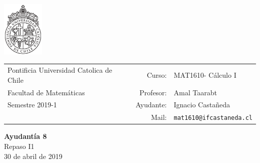 \documentclass[12pt]{article}
\makeatletter
\newcommand{\ayudantia}{{\sc Ayudantía 8}}
\newcommand{\tituloayu}{Repaso I1}
\newcommand{\fecha}{30 de abril de 2019}
\newcommand{\sigla}{MAT1610}
\newcommand{\nombre}{Cálculo I}
\newcommand{\profesor}{Amal Taarabt}
\newcommand{\ano}{2019}
\newcommand{\semestre}{1}
\newcommand{\mail}{mat1610@ifcastaneda.cl}
\makeatother
\begin{document}
\thispagestyle{empty}

\begin{minipage}{2cm}
	\includegraphics[width=2cm]{../../../../img/logo.pdf}
	\vspace{0.5cm}
\end{minipage}
\begin{minipage}{\linewidth}
	\begin{tabular}{lrl}
		{\scriptsize\sc Pontificia Universidad Catolica de Chile} & \hspace*{0.7in}Curso: &
		\sigla  - \nombre\\
		{\sc Facultad de Matemáticas}&
		Profesor: & \profesor \\
		{\sc Semestre \ano-\semestre} & Ayudante: & {Ignacio Castañeda}\\
		& {Mail:} & \texttt{\mail}
	\end{tabular}
\end{minipage}

\vspace{-10mm}
\begin{center}
	{\LARGE\bf \ayudantia}\\
	\vspace{0.1cm}
	{\tituloayu}\\
	\vspace{0.1cm}
	\fecha\\
	\vspace{0.4cm}
\end{center}
\end{document}
